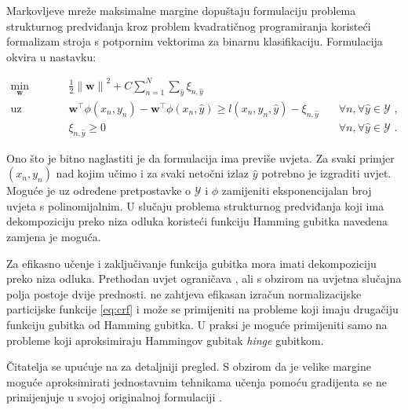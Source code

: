 Markovljeve mreže maksimalne margine  dopuštaju formulaciju problema strukturnog predviđanja kroz
problem kvadratičnog programiranja  koristeći
formalizam stroja s potpornim vektorima za binarnu klasifikaciju. Formulacija \mmmm{} okvira u nastavku:

\begin{equation}\label{eq:mmmm}
\begin{aligned}
  \min_{\mathbf{w}} & \quad \frac{1}{2} {\lVert\mathbf{w}\lVert}^2 + C \sum_{n=1}^{N}\sum_{\hat{y}} \xi_{n,\hat{y}}                        & \\
  \text{uz uvjete}  & \quad \mathbf{w}^\top \phi(x_n, y_n) - \mathbf{w}^\top \phi(x_n, \hat{y}) \ge l(x_n, y_n, \hat{y}) - \xi_{n,\hat{y}} & \quad \forall n, \forall \hat{y} \in \mathcal{Y} \text{ ,}\\
                    & \quad \xi_{n,\hat{y}} \ge 0                                                                                          & \quad \forall n, \forall \hat{y} \in \mathcal{Y} \text{ .}
\end{aligned}
\end{equation}

Ono što je bitno naglastiti je da \mmmm{} formulacija ima previše uvjeta. Za
svaki primjer $(x_n, y_n)$ nad kojim učimo i za svaki netočni izlaz $\hat{y}$
potrebno je izgraditi uvjet. Moguće je uz određene pretpostavke o $\mathcal{Y}$
i $\phi$ zamijeniti eksponencijalan broj uvjeta s polinomijalnim. U slučaju
problema strukturnog predviđanja koji ima dekompoziciju preko niza odluka
koristeći funkciju Hamming gubitka navedena zamjena je moguća.

Za efikasno učenje i zaključivanje funkcija gubitka mora imati dekompoziciju
preko niza odluka. Prethodan uvjet ograničava \mmmm{}, ali s obzirom na uvjetna
slučajna polja postoje dvije prednosti. \mmmm{} ne zahtjeva efikasan izračun
normalizacijske particijske funkcije \ref{eq:crf} i može se primijeniti na
probleme koji imaju drugačiju funkciju gubitka od Hamming gubitka. U praksi je
moguće primijeniti \mmmm{} samo na probleme koji aproksimiraju Hammingov gubitak
\textit{hinge} gubitkom.

Čitatelja se upućuje na \citep{taskar2003maximum} za detaljniji pregled. S
obzirom da je velike margine moguće aproksimirati jednostavnim tehnikama učenja
pomoću gradijenta \mmmm{} se ne primijenjuje u svojoj originalnoj formulaciji
\citep{daume2005learning, ratliff2006maximum}.
